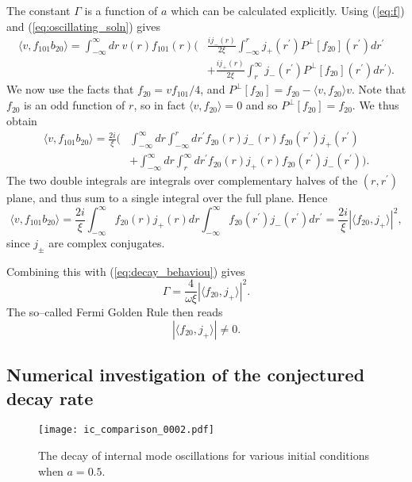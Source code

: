 The constant $\Gamma$ is a function of $a$ which can be calculated explicitly. Using (\ref{eq:f}) and (\ref{eq:oscillating_soln}) gives
\begin{align*}
\langle v, f_{101}b_{20}\rangle = \int_{-\infty}^{\infty}dr\ v(r)f_{101}(r)\bigg(&\frac{ij_-(r)}{2\xi}\int_{-\infty}^r j_+(r^\prime)P^\perp[f_{20}](r^\prime)dr^\prime \\
&+ \frac{ij_+(r)}{2\xi}\int_r^{\infty} j_-(r^\prime)P^\perp[f_{20}](r^\prime) dr^\prime\bigg).
\end{align*}
We now use the facts that $f_{20}=vf_{101}/4$, and $P^\perp[f_{20}]=f_{20}-\langle v,f_{20}\rangle v$. Note that $f_{20}$ is an odd function of $r$, so in fact $\langle v,f_{20}\rangle=0$ and so $P^\perp[f_{20}]=f_{20}$. We thus obtain
\begin{align*}
\langle v, f_{101}b_{20}\rangle = \frac{2i}{\xi}\bigg(&\int_{-\infty}^{\infty}dr
\int_{-\infty}^r dr^\prime f_{20}(r)j_-(r)f_{20}(r^\prime)j_+(r^\prime) \\
&+ \int_{-\infty}^{\infty}dr\int_r^{\infty}dr^\prime f_{20}(r)j_+(r)f_{20}(r^\prime)j_-(r^\prime)\bigg).
\end{align*}
The two double integrals are integrals over complementary halves of the $(r,r^\prime)$ plane, and thus sum to a single integral over the full plane. Hence
\[
\langle v, f_{101}b_{20}\rangle = \frac{2i}{\xi}\int_{-\infty}^{\infty}f_{20}(r)j_+(r)dr
\int_{-\infty}^\infty  f_{20}(r^\prime)j_-(r^\prime) dr^\prime=\frac{2i}{\xi}|\langle f_{20}, j_+ \rangle|^2,
\]
since $j_\pm$ are complex conjugates.

Combining this with (\ref{eq:decay_behaviou}) gives
\[
\Gamma = \frac{4}{\omega\xi}|\langle f_{20}, j_+\rangle|^2.
\]
The so--called Fermi Golden Rule then reads
\[
|\langle f_{20}, j_+\rangle|\neq 0.
\]

\subsection{Numerical investigation of the conjectured decay rate}
\label{sec:numerics}

\begin{figure}
\texttt{[image: ic\_comparison\_0002.pdf]}
\caption{\label{fig:decay} The decay of internal mode oscillations for various initial conditions when $a=0.5$.}
\end{figure}

